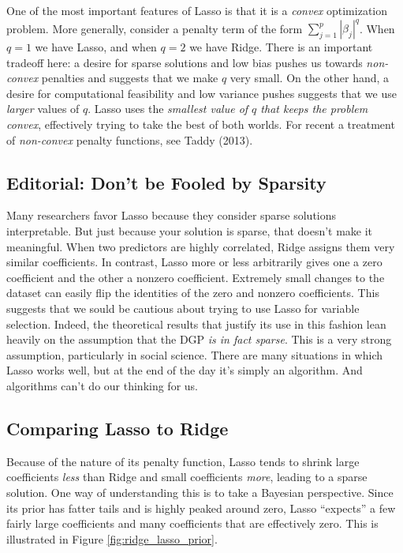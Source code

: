 One of the most important features of Lasso is that it is a \emph{convex} optimization problem. More generally, consider a penalty term of the form $\sum_{j=1}^p |\beta_j|^q$. When $q=1$ we have Lasso, and when $q = 2$ we have Ridge.  There is an important tradeoff here: a desire for sparse solutions and low bias pushes us towards \emph{non-convex} penalties and suggests that we make $q$ very small. On the other hand, a desire for computational feasibility and low variance pushes suggests that we use \emph{larger} values of $q$. Lasso uses the \emph{smallest value of $q$ that keeps the problem convex}, effectively trying to take the best of both worlds. For recent a treatment of \emph{non-convex} penalty functions, see Taddy (2013).

\subsection{Editorial: Don't be Fooled by Sparsity}
Many researchers favor Lasso because they consider sparse solutions interpretable. But just because your solution is sparse, that doesn't make it meaningful. When two predictors are highly correlated, Ridge assigns them very similar coefficients. In contrast, Lasso more or less arbitrarily gives one a zero coefficient and the other a nonzero coefficient. Extremely small changes to the dataset can easily flip the identities of the zero and nonzero coefficients. This suggests that we sould be cautious about trying to use Lasso for variable selection. Indeed, the theoretical results that justify its use in this fashion lean heavily on the assumption that the DGP \emph{is in fact sparse}. This is a very strong assumption, particularly in social science. There are many situations in which Lasso works well, but at the end of the day it's simply an algorithm. And algorithms can't do our thinking for us.


\subsection{Comparing Lasso to Ridge}
Because of the nature of its penalty function, Lasso tends to shrink large coefficients \emph{less} than Ridge and small coefficients \emph{more}, leading to a sparse solution. One way of understanding this is to take a Bayesian perspective. Since its prior has fatter tails and is highly peaked around zero, Lasso ``expects'' a few fairly large coefficients and many coefficients that are effectively zero. This is illustrated in Figure \ref{fig:ridge_lasso_prior}.

